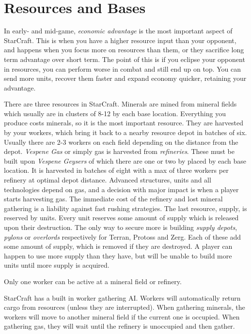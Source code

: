 \chapter{Resources and Bases}
In early- and mid-game, \emph{economic advantage} is the most important aspect of StarCraft. This is when you have a higher resource input than your opponent, and happens when you focus more on resources than them, or they sacrifice long term advantage over short term. The point of this is if you eclipse your opponent in resources, you can perform worse in combat and still end up on top. You can send more units, recover them faster and expand economy quicker, retaining your advantage.

There are three resources in StarCraft. Minerals are mined from mineral fields which usually are in clusters of 8-12 by each base location. Everything you produce costs minerals, so it is the most important resource. They are harvested by your workers, which bring it back to a nearby resource depot in batches of six. Usually there are 2-3 workers on each field depending on the distance from the depot. \emph{Vespene Gas} or simply gas is harvested from \emph{refineries}. These must be built upon \emph{Vespene Geysers} of which there are one or two by placed by each base location. It is harvested in batches of eight with a max of three workers per refinery at optimal depot distance. Advanced structures, units and all technologies depend on gas, and a decision with major impact is when a player starts harvesting gas. The immediate cost of the refinery and lost mineral gathering is a liability against fast rushing strategies. The last resource, supply, is reserved by units. Every unit reserves some amount of supply which is released upon their destruction. The only way to secure more is building \emph{supply depots}, \emph{pylons} or \emph{overlords} respectively for Terran, Protoss and Zerg. Each of these add some amount of supply, which is removed if they are destroyed. A player can happen to use more supply than they have, but will be unable to build more units until more supply is acquired.

Only one worker can be active at a mineral field or refinery.

StarCraft has a built in worker gathering AI. Workers will automatically return cargo from resources (unless they are interrupted). When gathering minerals, the workers will move to another mineral field if the current one is occupied. When gathering gas, they will wait until the refinery is unoccupied and then gather.

